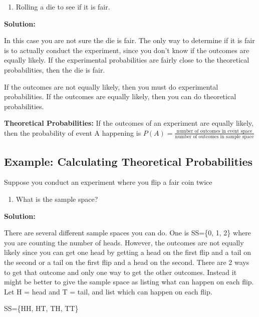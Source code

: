 \documentclass[
]{book}
\providecommand{\tightlist}{%
  \setlength{\itemsep}{0pt}\setlength{\parskip}{0pt}}
\begin{document}
\begin{enumerate}
\def\labelenumi{\alph{enumi}.}
\setcounter{enumi}{4}
\tightlist
\item
  Rolling a die to see if it is fair.
\end{enumerate}

\textbf{Solution:}

In this case you are not sure the die is fair. The only way to determine if it is fair is to actually conduct the experiment, since you don't know if the outcomes are equally likely. If the
experimental probabilities are fairly close to the theoretical probabilities, then the die is fair.

If the outcomes are not equally likely, then you must do experimental probabilities. If the outcomes are equally likely, then you can do theoretical probabilities.

\textbf{Theoretical Probabilities:} If the outcomes of an experiment are equally likely, then the probability of event A happening is \(P(A)=\frac{\text{number of outcomes in event space}}{\text{number of outcomes in sample space}}\)

\hypertarget{example-calculating-theoretical-probabilities}{%
\subsection{Example: Calculating Theoretical Probabilities}\label{example-calculating-theoretical-probabilities}}

Suppose you conduct an experiment where you flip a fair coin twice

\begin{enumerate}
\def\labelenumi{\alph{enumi}.}
\tightlist
\item
  What is the sample space?
\end{enumerate}

\textbf{Solution:}

There are several different sample spaces you can do. One is SS=\{0, 1, 2\} where you are counting the number of heads. However, the outcomes are not equally likely since you can get one head by getting a head on the first flip and a tail on the second or a tail on the first flip and a head on the second. There are 2 ways to get that outcome and only one way to get the other outcomes. Instead it might be better to give the sample space as listing what can happen on each flip. Let H = head and T = tail, and list which can happen on each flip.

SS=\{HH, HT, TH, TT\}
\end{document}
